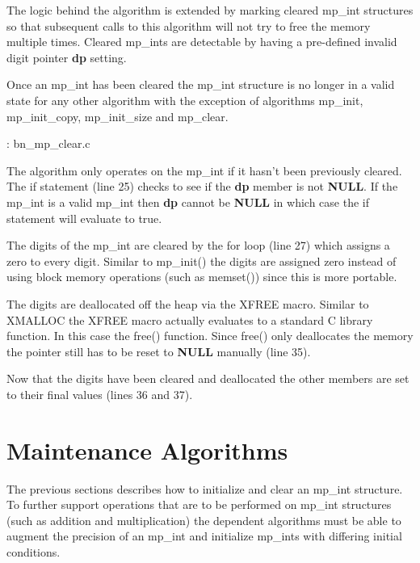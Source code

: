 \documentclass[b5paper]{book}
\begin{document}
The logic behind the algorithm is extended by marking cleared mp\_int structures so that subsequent calls to this
algorithm will not try to free the memory multiple times.  Cleared mp\_ints are detectable by having a pre-defined invalid 
digit pointer \textbf{dp} setting.

Once an mp\_int has been cleared the mp\_int structure is no longer in a valid state for any other algorithm
with the exception of algorithms mp\_init, mp\_init\_copy, mp\_init\_size and mp\_clear.

\vspace{+3mm}\begin{small}
\hspace{-5.1mm}{\bf File}: bn\_mp\_clear.c
\vspace{-3mm}
\begin{alltt}
\end{alltt}
\end{small}

The algorithm only operates on the mp\_int if it hasn't been previously cleared.  The if statement (line 25)
checks to see if the \textbf{dp} member is not \textbf{NULL}.  If the mp\_int is a valid mp\_int then \textbf{dp} cannot be
\textbf{NULL} in which case the if statement will evaluate to true.

The digits of the mp\_int are cleared by the for loop (line 27) which assigns a zero to every digit.  Similar to mp\_init()
the digits are assigned zero instead of using block memory operations (such as memset()) since this is more portable.  

The digits are deallocated off the heap via the XFREE macro.  Similar to XMALLOC the XFREE macro actually evaluates to
a standard C library function.  In this case the free() function.  Since free() only deallocates the memory the pointer
still has to be reset to \textbf{NULL} manually (line 35).  

Now that the digits have been cleared and deallocated the other members are set to their final values (lines 36 and 37).

\section{Maintenance Algorithms}

The previous sections describes how to initialize and clear an mp\_int structure.  To further support operations
that are to be performed on mp\_int structures (such as addition and multiplication) the dependent algorithms must be
able to augment the precision of an mp\_int and 
initialize mp\_ints with differing initial conditions.  
\end{document}
